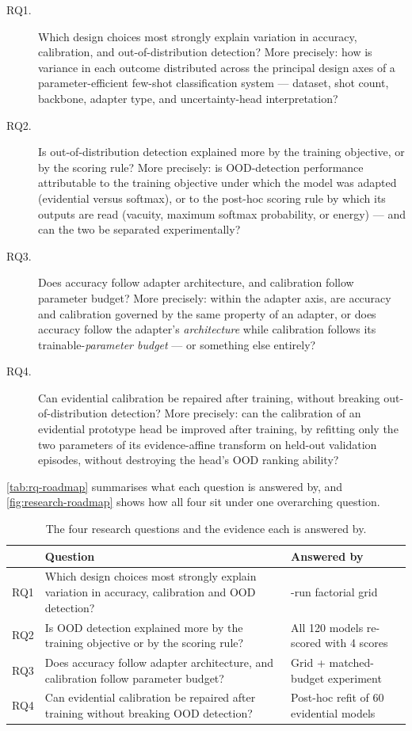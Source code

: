 \documentclass{iutbscthesis}
\begin{document}
\begin{description}
    \item[RQ1.] Which design choices most strongly explain variation in accuracy, calibration, and out-of-distribution detection? More precisely: how is variance in each outcome distributed across the principal design axes of a parameter-efficient few-shot classification system — dataset, shot count, backbone, adapter type, and uncertainty-head interpretation?
    \item[RQ2.] Is out-of-distribution detection explained more by the training objective, or by the scoring rule? More precisely: is OOD-detection performance attributable to the training objective under which the model was adapted (evidential versus softmax), or to the post-hoc scoring rule by which its outputs are read (vacuity, maximum softmax probability, or energy) — and can the two be separated experimentally?
    \item[RQ3.] Does accuracy follow adapter architecture, and calibration follow parameter budget? More precisely: within the adapter axis, are accuracy and calibration governed by the same property of an adapter, or does accuracy follow the adapter's \emph{architecture} while calibration follows its trainable-\emph{parameter budget} — or something else entirely?
    \item[RQ4.] Can evidential calibration be repaired after training, without breaking out-of-distribution detection? More precisely: can the calibration of an evidential prototype head be improved after training, by refitting only the two parameters of its evidence-affine transform on held-out validation episodes, without destroying the head's OOD ranking ability?
\end{description}

\autoref{tab:rq-roadmap} summarises what each question is answered by, and \autoref{fig:research-roadmap} shows how all four sit under one overarching question.

\begin{table}[H]
    \centering
    \small
    \begin{tabular}{l >{\raggedright\arraybackslash}p{7.5cm} >{\raggedright\arraybackslash}p{4cm}}
        \toprule
        & Question & Answered by \\
        \midrule
        RQ1 & Which design choices most strongly explain variation in accuracy, calibration and OOD detection? & 120-run factorial grid \\
        RQ2 & Is OOD detection explained more by the training objective or by the scoring rule? & All 120 models re-scored with 4 scores \\
        RQ3 & Does accuracy follow adapter architecture, and calibration follow parameter budget? & Grid + matched-budget experiment \\
        RQ4 & Can evidential calibration be repaired after training without breaking OOD detection? & Post-hoc refit of 60 evidential models \\
        \bottomrule
    \end{tabular}
    \caption{The four research questions and the evidence each is answered by.}
    \label{tab:rq-roadmap}
\end{table}
\end{document}
